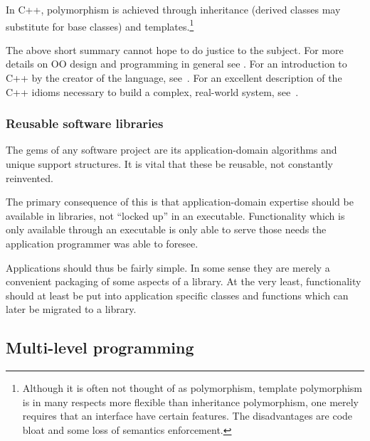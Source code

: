 In C++, polymorphism is achieved through inheritance (derived classes
may substitute for base classes) and templates.\footnote{Although it
is often not thought of as polymorphism, template polymorphism is in
many respects more flexible than inheritance polymorphism, one merely
requires that an interface have certain features. The disadvantages
are code bloat and some loss of semantics enforcement.}

The above short summary cannot hope to do justice to the subject. For
more details on OO design and programming in general see
\cite{booch:oo,meyer:oo,rumbaugh:oo}. For an introduction to C++ by
the creator of the language, see~\cite{stroustrup:c}. For an excellent
description of the C++ idioms necessary to build a complex, real-world
system, see~\cite{bn:scientific}.

\subsubsection{Reusable software libraries}

The gems of any software project are its application-domain algorithms
and unique support structures. It is vital that these be reusable, not
constantly reinvented.

The primary consequence of this is that application-domain expertise
should be available in libraries, not ``locked up'' in an executable.
Functionality which is only available through an executable is only
able to serve those needs the application programmer was able to
foresee.

Applications should thus be fairly simple. In some sense they are
merely a convenient packaging of some aspects of a library. At the
very least, functionality should at least be put into application
specific classes and functions which can later be migrated to a
library.

\subsection{Multi-level programming}

